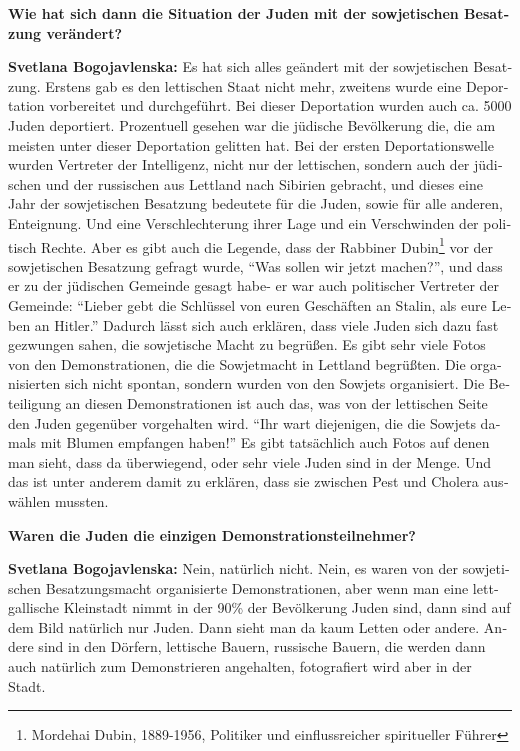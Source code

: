 \begin{otherlanguage}{ngerman}
\textbf{Wie hat sich dann die Situation der Juden mit der sowjetischen Besatzung verändert?}

\textbf{Svetlana Bogojavlenska:} Es hat sich alles geändert mit der sowjetischen Besatzung. Erstens gab es den lettischen Staat nicht mehr, zweitens wurde eine Deportation vorbereitet und durchgeführt. Bei dieser Deportation wurden auch ca. 5000 Juden deportiert. Prozentuell gesehen war die jüdische Bevölkerung die, die am meisten unter dieser Deportation gelitten hat. Bei der ersten Deportationswelle wurden Vertreter der Intelligenz, nicht nur der lettischen, sondern auch der jüdischen und der russischen aus Lettland nach Sibirien gebracht, und dieses eine Jahr der sowjetischen Besatzung bedeutete für die Juden, sowie für alle anderen, Enteignung. Und eine Verschlechterung ihrer Lage und ein Verschwinden der politisch Rechte. 
Aber es gibt auch die Legende, dass der Rabbiner Dubin\footnote{Mordehai Dubin, 1889-1956, Politiker und einflussreicher spiritueller Führer} vor der sowjetischen Besatzung gefragt wurde, "`Was sollen wir jetzt machen?"', und dass er zu der jüdischen Gemeinde gesagt habe- er war auch politischer Vertreter der Gemeinde: "`Lieber gebt die Schlüssel von euren Geschäften an Stalin, als eure Leben an Hitler."' Dadurch lässt sich auch erklären, dass viele Juden sich dazu fast gezwungen sahen, die sowjetische Macht zu begrüßen. Es gibt sehr viele Fotos von den Demonstrationen, die die Sowjetmacht in Lettland begrüßten. Die organisierten sich nicht spontan, sondern wurden von den Sowjets organisiert. Die Beteiligung an diesen Demonstrationen ist auch das, was von der lettischen Seite den Juden gegenüber vorgehalten wird. "`Ihr wart diejenigen, die die Sowjets damals mit Blumen empfangen haben!"' Es gibt tatsächlich auch Fotos auf denen man sieht, dass da überwiegend, oder sehr viele Juden sind in der Menge. Und das ist unter anderem damit zu erklären, dass sie zwischen Pest und Cholera auswählen mussten. 

\textbf{Waren die Juden die einzigen Demonstrationsteilnehmer?}

\textbf{Svetlana Bogojavlenska:} Nein, natürlich nicht. Nein, es waren von der sowjetischen Besatzungsmacht organisierte Demonstrationen, aber wenn man eine lettgallische Kleinstadt nimmt in der 90\% der Bevölkerung Juden sind, dann sind auf dem Bild natürlich nur Juden. Dann sieht man da kaum Letten oder andere. Andere sind in den Dörfern, lettische Bauern, russische Bauern, die werden dann auch natürlich zum Demonstrieren angehalten, fotografiert wird aber in der Stadt.


\end{otherlanguage}
